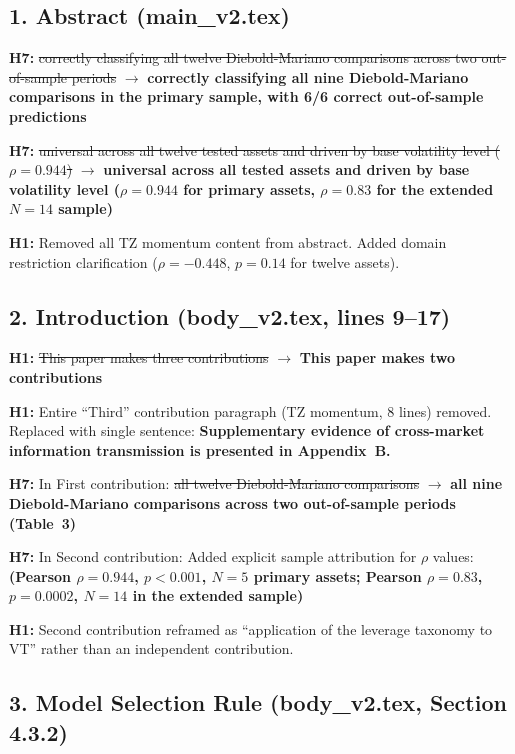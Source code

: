\documentclass[12pt,a4paper]{article}
\newcommand{\old}[1]{\textcolor{oldred}{\st{#1}}}
\newcommand{\new}[1]{\textcolor{newgreen}{\textbf{#1}}}
\begin{document}
\subsection*{1. Abstract (main\_v2.tex)}

\textbf{H7:} \old{correctly classifying all twelve Diebold-Mariano comparisons across two out-of-sample periods} $\to$ \new{correctly classifying all nine Diebold-Mariano comparisons in the primary sample, with 6/6 correct out-of-sample predictions}

\textbf{H7:} \old{universal across all twelve tested assets and driven by base volatility level ($\rho = 0.944$)} $\to$ \new{universal across all tested assets and driven by base volatility level ($\rho = 0.944$ for primary assets, $\rho = 0.83$ for the extended $N = 14$ sample)}

\textbf{H1:} Removed all TZ momentum content from abstract. Added domain restriction clarification ($\rho = -0.448$, $p = 0.14$ for twelve assets).

\subsection*{2. Introduction (body\_v2.tex, lines 9--17)}

\textbf{H1:} \old{This paper makes three contributions} $\to$ \new{This paper makes two contributions}

\textbf{H1:} Entire ``Third'' contribution paragraph (TZ momentum, 8 lines) removed. Replaced with single sentence: \new{Supplementary evidence of cross-market information transmission is presented in Appendix~B.}

\textbf{H7:} In First contribution: \old{all twelve Diebold-Mariano comparisons} $\to$ \new{all nine Diebold-Mariano comparisons across two out-of-sample periods (Table~3)}

\textbf{H7:} In Second contribution: Added explicit sample attribution for $\rho$ values: \new{(Pearson $\rho = 0.944$, $p < 0.001$, $N = 5$ primary assets; Pearson $\rho = 0.83$, $p = 0.0002$, $N = 14$ in the extended sample)}

\textbf{H1:} Second contribution reframed as ``application of the leverage taxonomy to VT'' rather than an independent contribution.

\subsection*{3. Model Selection Rule (body\_v2.tex, Section 4.3.2)}
\end{document}
